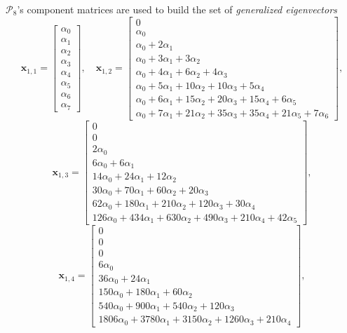 \begin{example}
$\mathcal{P}_{8}$'s component matrices are used to build the set of
\textit{generalized eigenvectors}
\begin{displaymath}
\boldsymbol{x}_{1,1} = \left[\begin{matrix}\alpha_{0}\\\alpha_{1}\\\alpha_{2}\\\alpha_{3}\\\alpha_{4}\\\alpha_{5}\\\alpha_{6}\\\alpha_{7}\end{matrix}\right], \quad \boldsymbol{x}_{1,2} = \left[\begin{matrix}0\\\alpha_{0}\\\alpha_{0} + 2 \alpha_{1}\\\alpha_{0} + 3 \alpha_{1} + 3 \alpha_{2}\\\alpha_{0} + 4 \alpha_{1} + 6 \alpha_{2} + 4 \alpha_{3}\\\alpha_{0} + 5 \alpha_{1} + 10 \alpha_{2} + 10 \alpha_{3} + 5 \alpha_{4}\\\alpha_{0} + 6 \alpha_{1} + 15 \alpha_{2} + 20 \alpha_{3} + 15 \alpha_{4} + 6 \alpha_{5}\\\alpha_{0} + 7 \alpha_{1} + 21 \alpha_{2} + 35 \alpha_{3} + 35 \alpha_{4} + 21 \alpha_{5} + 7 \alpha_{6}\end{matrix}\right],
\end{displaymath}
\begin{displaymath}
\boldsymbol{x}_{1,3} = \left[\begin{matrix}0\\0\\2 \alpha_{0}\\6 \alpha_{0} + 6 \alpha_{1}\\14 \alpha_{0} + 24 \alpha_{1} + 12 \alpha_{2}\\30 \alpha_{0} + 70 \alpha_{1} + 60 \alpha_{2} + 20 \alpha_{3}\\62 \alpha_{0} + 180 \alpha_{1} + 210 \alpha_{2} + 120 \alpha_{3} + 30 \alpha_{4}\\126 \alpha_{0} + 434 \alpha_{1} + 630 \alpha_{2} + 490 \alpha_{3} + 210 \alpha_{4} + 42 \alpha_{5}\end{matrix}\right],
\end{displaymath}
\begin{displaymath}
\boldsymbol{x}_{1,4} = \left[\begin{matrix}0\\0\\0\\6 \alpha_{0}\\36 \alpha_{0} + 24 \alpha_{1}\\150 \alpha_{0} + 180 \alpha_{1} + 60 \alpha_{2}\\540 \alpha_{0} + 900 \alpha_{1} + 540 \alpha_{2} + 120 \alpha_{3}\\1806 \alpha_{0} + 3780 \alpha_{1} + 3150 \alpha_{2} + 1260 \alpha_{3} + 210 \alpha_{4}\end{matrix}\right],

\end{displaymath}
\end{example}

